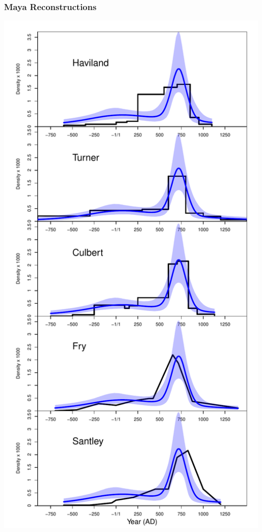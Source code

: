 \documentclass{beamer}
\begin{document}
\begin{frame}[t]
  \frametitle{Maya Reconstructions}
    \includegraphics[height=.85\textheight]{Fig3_tikal_prev_expert_comparison.pdf}
\end{frame}
\end{document}
